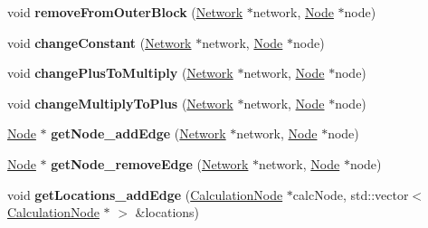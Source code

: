 \begin{DoxyCompactItemize}
\item 
void {\bfseries remove\+From\+Outer\+Block} (\hyperlink{classNetwork}{Network} $\ast$network, \hyperlink{classNode}{Node} $\ast$node)\hypertarget{classNetworkModifier_aa61381ec53af37a67753b95e162e2ee6}{}\label{classNetworkModifier_aa61381ec53af37a67753b95e162e2ee6}

\item 
void {\bfseries change\+Constant} (\hyperlink{classNetwork}{Network} $\ast$network, \hyperlink{classNode}{Node} $\ast$node)\hypertarget{classNetworkModifier_a574c45de40cd717c66412a821dec7720}{}\label{classNetworkModifier_a574c45de40cd717c66412a821dec7720}

\item 
void {\bfseries change\+Plus\+To\+Multiply} (\hyperlink{classNetwork}{Network} $\ast$network, \hyperlink{classNode}{Node} $\ast$node)\hypertarget{classNetworkModifier_af847b438d989b02336200e47f2059be5}{}\label{classNetworkModifier_af847b438d989b02336200e47f2059be5}

\item 
void {\bfseries change\+Multiply\+To\+Plus} (\hyperlink{classNetwork}{Network} $\ast$network, \hyperlink{classNode}{Node} $\ast$node)\hypertarget{classNetworkModifier_a50d862b93e5f37acaa073e5edaad9a2c}{}\label{classNetworkModifier_a50d862b93e5f37acaa073e5edaad9a2c}

\item 
\hyperlink{classNode}{Node} $\ast$ {\bfseries get\+Node\+\_\+add\+Edge} (\hyperlink{classNetwork}{Network} $\ast$network, \hyperlink{classNode}{Node} $\ast$node)\hypertarget{classNetworkModifier_a3ca48b0cbcc665ffadd0cebcc3a3e45b}{}\label{classNetworkModifier_a3ca48b0cbcc665ffadd0cebcc3a3e45b}

\item 
\hyperlink{classNode}{Node} $\ast$ {\bfseries get\+Node\+\_\+remove\+Edge} (\hyperlink{classNetwork}{Network} $\ast$network, \hyperlink{classNode}{Node} $\ast$node)\hypertarget{classNetworkModifier_a1519488c4c8787563bd37b8591f741bf}{}\label{classNetworkModifier_a1519488c4c8787563bd37b8591f741bf}

\item 
void {\bfseries get\+Locations\+\_\+add\+Edge} (\hyperlink{classCalculationNode}{Calculation\+Node} $\ast$calc\+Node, std\+::vector$<$ \hyperlink{classCalculationNode}{Calculation\+Node} $\ast$ $>$ \&locations)\hypertarget{classNetworkModifier_ac2e65c2e6985a1b6b8d90e0d5eac7b36}{}\label{classNetworkModifier_ac2e65c2e6985a1b6b8d90e0d5eac7b36}


\end{DoxyCompactItemize}
